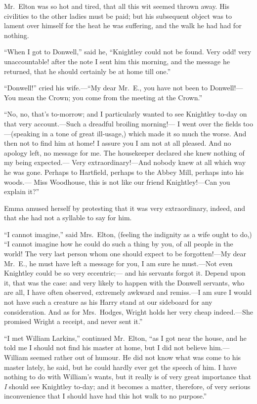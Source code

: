 Mr.\ Elton was so hot and tired, that all this wit seemed thrown away.
His civilities to the other ladies must be paid; but his subsequent
object was to lament over himself for the heat he was suffering,
and the walk he had had for nothing.

``When I got to Donwell,'' said he, ``Knightley could not be found.
Very odd! very unaccountable! after the note I sent him this morning,
and the message he returned, that he should certainly be at home
till one.''

``Donwell!'' cried his wife.---``My dear Mr.\ E., you have not been
to Donwell!---You mean the Crown; you come from the meeting at the Crown.''

``No, no, that's to-morrow; and I particularly wanted to see Knightley
to-day on that very account.---Such a dreadful broiling morning!---%
I went over the fields too---(speaking in a tone of great ill-usage,)
which made it so much the worse.  And then not to find him at home!
I assure you I am not at all pleased.  And no apology left, no message
for me.  The housekeeper declared she knew nothing of my being expected.---%
Very extraordinary!---And nobody knew at all which way he was gone.
Perhaps to Hartfield, perhaps to the Abbey Mill, perhaps into his woods.---%
Miss Woodhouse, this is not like our friend Knightley!---Can you
explain it?''

Emma amused herself by protesting that it was very extraordinary,
indeed, and that she had not a syllable to say for him.

``I cannot imagine,'' said Mrs.\ Elton, (feeling the indignity as a wife
ought to do,) ``I cannot imagine how he could do such a thing by you,
of all people in the world!  The very last person whom one should expect
to be forgotten!---My dear Mr.\ E., he must have left a message for you,
I am sure he must.---Not even Knightley could be so very eccentric;---%
and his servants forgot it.  Depend upon it, that was the case:
and very likely to happen with the Donwell servants, who are all,
I have often observed, extremely awkward and remiss.---I am sure I
would not have such a creature as his Harry stand at our sideboard
for any consideration.  And as for Mrs.\ Hodges, Wright holds
her very cheap indeed.---She promised Wright a receipt, and never
sent it.''

``I met William Larkins,'' continued Mr.\ Elton, ``as I got near
the house, and he told me I should not find his master at home,
but I did not believe him.---William seemed rather out of humour.
He did not know what was come to his master lately, he said, but he
could hardly ever get the speech of him.  I have nothing to do with
William's wants, but it really is of very great importance that \emph{I}
should see Knightley to-day; and it becomes a matter, therefore,
of very serious inconvenience that I should have had this hot walk
to no purpose.''

